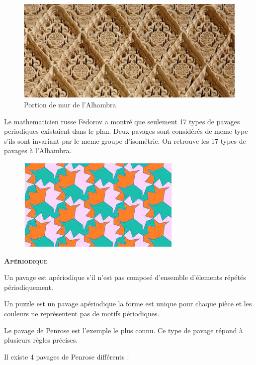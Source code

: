 \documentclass{article}
\begin{document}
\begin{figure} [h]
    \center
    \includegraphics [scale=0.3] {image/Alhambra.jpg}
    \caption{Portion de mur de l'Alhambra}
\end{figure}

Le mathematicien russe Fedorov a montré que seulement 17 types de pavages periodiques existaient dans le plan.
Deux pavages sont considérés de meme type s’ils sont invariant par le meme groupe d’isométrie.
On retrouve les 17 types de pavages à l'Alhambra.

\begin{figure} [h]
    \center
    \includegraphics [scale=0.5] {image/Ex1_pavage.jpg}
\end{figure}

\hspace{1.5cm}

\textbf{\textsc{Apériodique}}

Un pavage est apériodique s'il n'est pas composé d'ensemble d'élements répétés périodiquement.

Un puzzle est un pavage apériodique la forme est unique pour chaque pièce et les couleurs ne représentent pas de motifs périodiques.


Le pavage de Penrose est l'exemple le plus connu.
Ce type de pavage répond à plusieurs règles précises.

\newpage

Il existe 4 pavages de Penrose différents :
\end{document}
